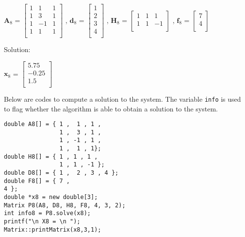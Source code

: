 \documentclass[a4paper]{article}
\begin{document}
$\boldsymbol{A}_{8}$ = $\begin{bmatrix}
1 &  1 & 1 \\ 
1 &  3 & 1 \\ 
1 & -1 & 1 \\
1 &  1 & 1 \\
\end{bmatrix}$ 
\hspace{0.5cm} , \hspace{0.5cm} 
$\boldsymbol{d}_{8}$ = $\begin{bmatrix}
1 \\  
2 \\ 
3 \\ 
4\\
\end{bmatrix}$ 
\hspace{0.5cm} , \hspace{0.5cm}  
$\boldsymbol{H}_{8}$ = $\begin{bmatrix}
1 & 1 & 1 \\
1 & 1 & -1 \\
\end{bmatrix}$ 
\hspace{0.5cm} , \hspace{0.5cm}   
$\boldsymbol{f}_{8}$ = $\begin{bmatrix}
7 \\
4 \\
\end{bmatrix}$ 

Solution:


$\boldsymbol{x}_{8}$ = $\begin{bmatrix}
5.75 \\
-0.25 \\
1.5  \\
\end{bmatrix}$   



Below are codes to compute a solution to the system. The variable \texttt{info} is used to flag whether the algorithm is able to obtain a solution to the system.




\begin{verbatim}  
double A8[] = { 1 ,  1 , 1 , 
                1 ,  3 , 1 , 
                1 , -1 , 1 , 
                1 ,  1 , 1};
double H8[] = { 1 , 1 , 1 ,
                1 , 1 , -1 };
double D8[] = { 1 ,  2 , 3 , 4 };
double F8[] = { 7 ,
4 };
double *x8 = new double[3];
Matrix P8(A8, D8, H8, F8, 4, 3, 2);
int info8 = P8.solve(x8);
printf("\n X8 = \n ");
Matrix::printMatrix(x8,3,1);
\end{verbatim}
\end{document}
